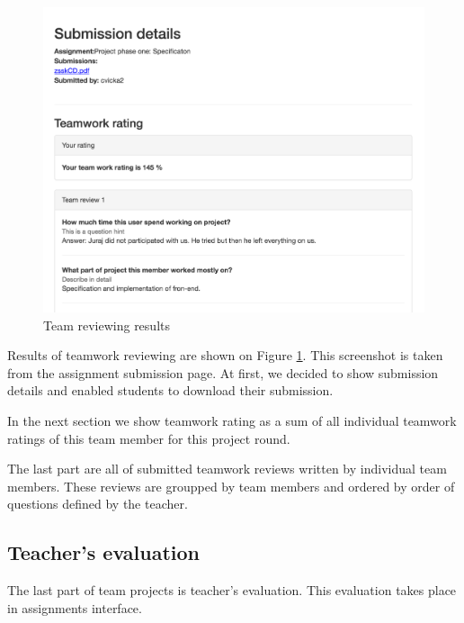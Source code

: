 \begin{figure}[h]
    \centering
    \includegraphics[width=\textwidth]{images/teamreview.png}
    \caption{Team reviewing results}
    \label{team_reviewing}
\end{figure}

Results of teamwork reviewing are shown on Figure \ref{team_reviewing}. This screenshot is taken from the assignment submission page. At first, we decided to show submission details and enabled students to download their submission.


In the next section we show teamwork rating as a sum of all individual teamwork ratings of this team member for this project round. 

The last part are all of submitted teamwork reviews written by individual team members. These reviews are groupped by team members and ordered by order of questions defined by the teacher.



\subsection{Teacher's evaluation}
The last part of team projects is teacher's evaluation. This evaluation takes place in assignments interface.

